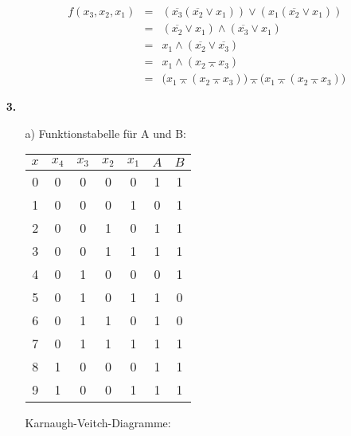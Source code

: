 \documentclass[a4paper,10pt]{scrartcl}
\begin{document}
\begin{enumerate}
\begin{enumerate}
            $$\begin{array}{rcl}
                f(x_3, x_2, x_1)
                &=& (\overline{x_3}(\overline{x_2} \vee x_1)) \vee (x_1 ( \overline{x_2} \vee x_1 ) )\\
                &=& (\overline{x_2} \vee x_1) \wedge (\overline{x_3} \vee x_1)\\
                &=& x_1 \wedge (\overline{x_2} \vee \overline{x_3})\\
                &=& x_1 \wedge (x_2 \barwedge x_3)\\
                &=& \big(x_1 \barwedge (x_2 \barwedge x_3)\big) \barwedge \big(x_1 \barwedge (x_2 \barwedge x_3)\big)
            \end{array}$$

    \end{enumerate}

    \newpage
    \item[\textbf{3.}]
    \begin{enumerate}
        \item[a)]
            Funktionstabelle für A und B:

            \begin{center}
                \begin{tabular}[t]{c||c|c|c|c||c|c}
                    $x$ & $x_4$ & $x_3$ & $x_2$ & $x_1$ & $A$ & $B$\\
                    \hline
                    0 & 0 & 0 & 0 & 0 & 1 & 1 \\
                    1 & 0 & 0 & 0 & 1 & 0 & 1 \\
                    2 & 0 & 0 & 1 & 0 & 1 & 1 \\
                    3 & 0 & 0 & 1 & 1 & 1 & 1 \\
                    4 & 0 & 1 & 0 & 0 & 0 & 1 \\
                    5 & 0 & 1 & 0 & 1 & 1 & 0 \\
                    6 & 0 & 1 & 1 & 0 & 1 & 0 \\
                    7 & 0 & 1 & 1 & 1 & 1 & 1 \\
                    8 & 1 & 0 & 0 & 0 & 1 & 1 \\
                    9 & 1 & 0 & 0 & 1 & 1 & 1
                \end{tabular}
            \end{center}

            Karnaugh-Veitch-Diagramme:

            \begin{minipage}[c]{0.4\textwidth}
                \centering
\end{minipage}
\end{enumerate}
\end{enumerate}
\end{document}

